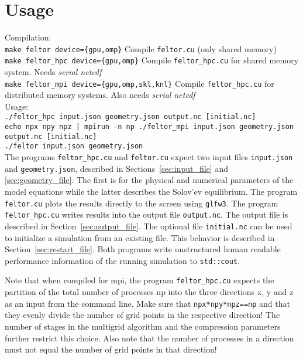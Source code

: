 \section{Usage}

Compilation:\\
\texttt{make feltor device=\{gpu,omp\}} Compile \texttt{feltor.cu} (only shared memory)\\
\texttt{make feltor\_hpc device=\{gpu,omp\}} Compile \texttt{feltor\_hpc.cu} for shared memory system. Needs {\it serial netcdf} \\
\texttt{make feltor\_mpi device=\{gpu,omp,skl,knl\}} Compile \texttt{feltor\_hpc.cu} for distributed memory systems. Also needs {\it serial netcdf}\\
Usage:\\
\texttt{./feltor\_hpc input.json geometry.json output.nc [initial.nc]} \\
\texttt{echo npx npy npz | mpirun -n np ./feltor\_mpi input.json geometry.json output.nc [initial.nc]} \\
\texttt{./feltor input.json geometry.json } \\

The programs \texttt{feltor\_hpc.cu} and \texttt{feltor.cu} expect two input
files \texttt{input.json} and \texttt{geometry.json}, described in Sections~\ref{sec:input_file} and \ref{sec:geometry_file}.
The first is for the physical and numerical parameters of the model equations
while the latter describes the Solov'ev equilibrium.
 The program \texttt{feltor.cu} plots the results directly to the screen using \texttt{glfw3}.
The program \texttt{feltor\_hpc.cu} writes results into
the output file \texttt{output.nc}.
 The output file is described in Section~\ref{sec:output_file}.
 The optional file \texttt{initial.nc} can be used to initialize a simulation from an existing file.
 This behavior is described in Section~\ref{sec:restart_file}.
 Both programs write unstructured human readable performance information of the running simulation
 to \texttt{std::cout}.

Note that when compiled for mpi, the program \texttt{feltor\_hpc.cu} expects the
partition of the total number of processes np into the three directions x, y and z
as an input from the command line. Make sure that \texttt{npx*npy*npz==np} and that
they evenly divide the number of grid points in the respective direction! The
number of stages in the multigrid algorithm and the compression parameters further
restrict this choice. Also note that the number of processes in a direction must
not equal the number of grid points in that direction!


